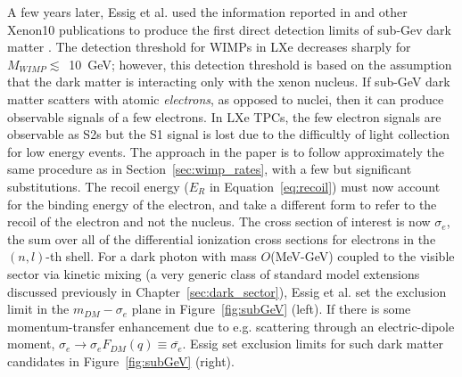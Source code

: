 A few years later, Essig et al. used the information reported in \cite{Angle2011} and other Xenon10 publications to produce the first direct detection limits of sub-Gev dark matter \cite{Essig2012}. The detection threshold for \ac{WIMP}s in \ac{LXe} decreases sharply for $M_{WIMP} \lesssim$~10~GeV; however, this detection threshold is based on the assumption that the dark matter is interacting only with the xenon nucleus. If sub-GeV dark matter scatters with atomic \textit{electrons}, as opposed to nuclei, then it can produce observable signals of a few electrons. In \ac{LXe} \ac{TPC}s, the few electron signals are observable as S2s but the S1 signal is lost due to the difficultly of light collection for low energy events. The approach in the paper is to follow approximately the same procedure as in Section~\ref{sec:wimp_rates}, with a few but significant substitutions. The recoil energy ($E_{R}$ in Equation~\ref{eq:recoil}) must now account for the binding energy of the electron, and take a different form to refer to the recoil of the electron and not the nucleus. The cross section of interest is now $\sigma_{e}$, the sum over all of the differential ionization cross sections for electrons in the $(n, l)$-th shell. For a dark photon with mass $O$(MeV-GeV) coupled to the visible sector via kinetic mixing (a very generic class of standard model extensions discussed previously in Chapter~\ref{sec:dark_sector}), Essig et al. set the exclusion limit in the $m_{DM}-\sigma_{e}$ plane in Figure~\ref{fig:subGeV} (left). If there is some momentum-transfer enhancement due to e.g. scattering through an electric-dipole moment, $\sigma_{e} \longrightarrow \sigma_{e}F_{DM}(q) \equiv \bar{\sigma_{e}}$. Essig set exclusion limits for such dark matter candidates in Figure~\ref{fig:subGeV} (right).


